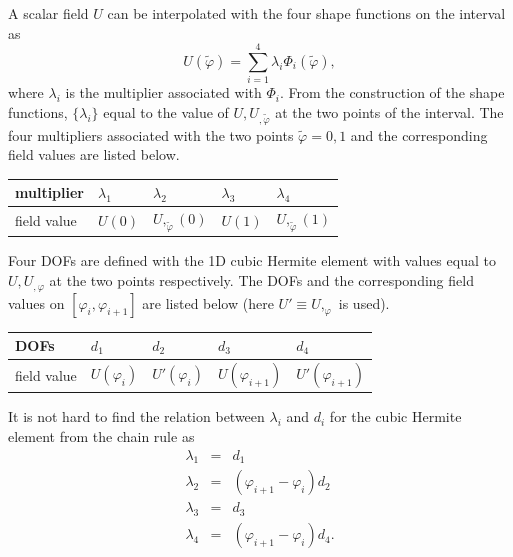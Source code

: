 \documentclass[11pt]{article}  %
\begin{document}
A scalar field $U$ can be interpolated with the four shape functions on the interval as
\begin{equation} \label{field}
U(\tilde{\varphi})=\sum_{i=1}^{4}\lambda_i \Phi_i(\tilde{\varphi}),
\end{equation} 
where $\lambda_i$ is the multiplier associated with $\Phi_i$. From the construction of the shape functions, $\{\lambda_i\}$  equal to the value of $U,U_{,\tilde{\varphi}}$ at the two points of the interval. The four multipliers associated with the two points $\tilde{\varphi}=0,1$ and the corresponding field values  are listed below.
\begin{center}
 \begin{tabular}{ |l|l|l|l|l|}
\hline
 multiplier & $\lambda_1$ & $\lambda_2$ & $\lambda_3$ & $\lambda_4$  \\ \hline
field value & $U(0)$ & $U,_{\tilde{\varphi}}(0)$ & $U(1)$ & $U,_{\tilde{\varphi}}(1)$ \\ \hline 
\end{tabular}
\end{center}

Four DOFs  are defined with the 1D cubic Hermite element with values equal to   $U,U_{,\varphi}$ at the two points respectively.   The DOFs and the corresponding field values on $[\varphi_i, \varphi_{i+1}]$ are listed below (here $U'\equiv U,_{\varphi}$ is used).
\begin{center}
 \begin{tabular}{ |l|l|l|l|l|}
\hline
 DOFs & $d_1$ & $d_2$ & $d_3$ & $d_4$   \\ \hline
field value & $U(\varphi_i)$ & $U'(\varphi_i)$ & $U(\varphi_{i+1})$ & $U'(\varphi_{i+1})$ \\ \hline 
\end{tabular}
\end{center}
It is not hard to find the relation between $\lambda_i$ and $d_i$ for the cubic Hermite element from the chain rule as
\begin{eqnarray}
\lambda_1 &=& d_1 \\
\lambda_2 &=& (\varphi_{i+1}-\varphi_{i}) d_2 \\
\lambda_3 &=&  d_3 \\
\lambda_4 &=& (\varphi_{i+1}-\varphi_{i}) d_4. 
\end{eqnarray}
\end{document}
